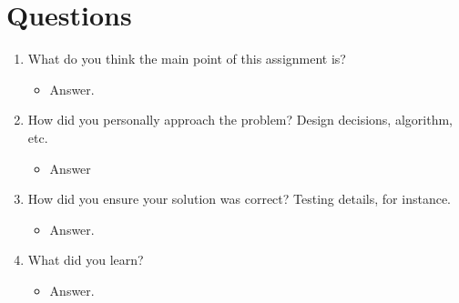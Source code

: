 \documentclass[letterpaper,10pt,onecolumn]{IEEEtran}
\begin{document}
    \section*{Questions}
    \begin{enumerate}
        \item What do you think the main point of this assignment is?
        \begin{itemize}
            \item Answer.
        \end{itemize}
        \item How did you personally approach the problem? Design decisions, algorithm, etc.
        \begin{itemize}
            \item Answer
        \end{itemize}
        \item How did you ensure your solution was correct? Testing details, for instance.
        \begin{itemize}
            \item Answer.
        \end{itemize}
        \item What did you learn?
        \begin{itemize}
            \item Answer.
        \end{itemize}
    \end{enumerate}
    
    
\end{document}

